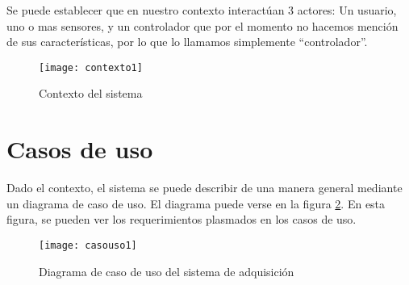 Se puede establecer que en nuestro contexto interactúan 3 actores: Un usuario, uno o mas sensores, y un controlador que por el momento no hacemos mención de sus características, por lo que lo llamamos simplemente ``controlador''.

\begin{figure}[h]
  \centering
  \texttt{[image: contexto1]}
  \caption{Contexto del sistema}\label{fig:contexto1}
\end{figure}


\section{Casos de uso} %
\label{sec:casos_de_uso}

Dado el contexto, el sistema se puede describir de una manera general mediante un diagrama de caso de uso. El diagrama puede verse en la figura \ref{fig:casouso1}. En esta figura, se pueden ver los requerimientos plasmados en los casos de uso.

\begin{figure}[h]
  \centering
  \texttt{[image: casouso1]}
  \caption{Diagrama de caso de uso del sistema de adquisición}\label{fig:casouso1}
\end{figure}



